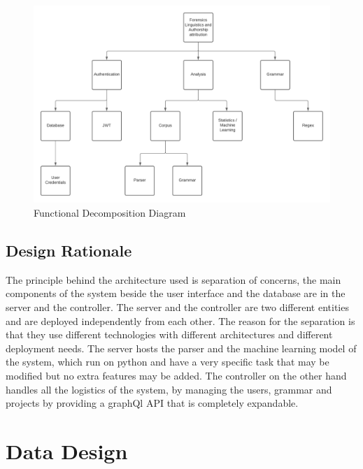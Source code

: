 \documentclass[12pt]{article}
\begin{document}
\begin{figure}[H]
  \includegraphics[width=15cm]{Images/FDD}
  \caption{Functional Decomposition Diagram}
\end{figure}


\subsection{Design Rationale}
The principle behind the architecture used is separation of concerns, the main components of the system beside the user interface and the database are in the server and the controller. The server and the controller are two different entities and are deployed independently from each other. The reason for the separation is that they use different technologies with different architectures and different deployment needs. The server hosts the parser and the machine learning model of the system, which run on python and have a very specific task that may be modified but no extra features may be added. The controller on the other hand handles all the logistics of the system, by managing the users, grammar and projects by providing a graphQl API that is completely expandable.


\section{Data Design}
\end{document}
